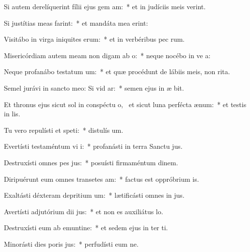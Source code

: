 \item Si autem derelíquerint fílii ejus gem am:~* et in judíciis meis  verint.
\item Si justítias meas farint:~* et mandáta mea  erint:
\item Visitábo in virga iniquites erum:~* et in verbéribus pec rum.
\item Misericórdiam autem meam non digam ab o:~* neque nocébo in ve a:
\item Neque profanábo testatum um:~* et quæ procédunt de lábiis meis, non  rita.
\item Semel jurávi in sancto meo: Si vid ar:~* semen ejus in æ bit.
\item Et thronus ejus sicut sol in conspéctu o,~\pscross{} et sicut luna perfécta  ænum:~* et testis in  lis.
\item Tu vero repulísti et speti:~* distulís  um.
\item Evertísti testaméntum vi i:~* profanásti in terra Sanctu jus.
\item Destruxísti omnes pes jus:~* posuísti firmaméntum  dinem.
\item Diripuérunt eum omnes transetes am:~* factus est oppróbrium  is.
\item Exaltásti déxteram depritium um:~* lætificásti omnes in jus.
\item Avertísti adjutórium dii jus:~* et non es auxiliátus   lo.
\item Destruxísti eum ab emuntine:~* et sedem ejus in ter ti.
\item Minorásti dies poris jus:~* perfudísti eum ne.
